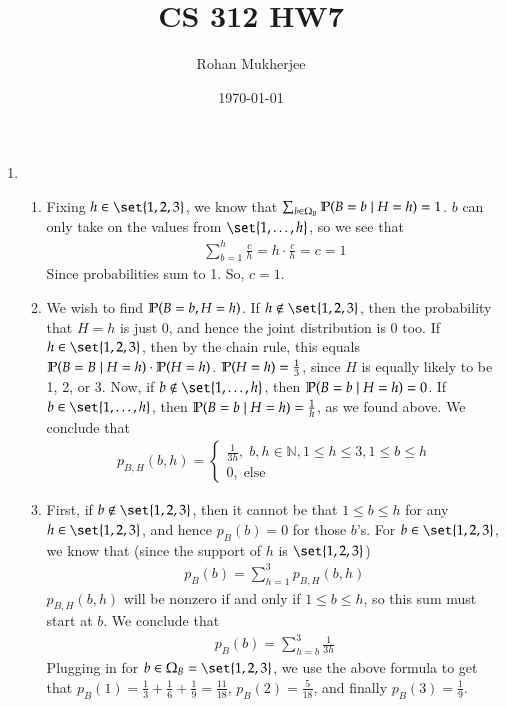 \documentclass[12pt]{article}
\title{CS 312 HW7}
\date{\today}
\author{Rohan Mukherjee}
\theoremstyle{definitionstyle}
\def\mbb#1{\mathbb{#1}}
\def\bN{\mbb{N}}
\renewcommand{\P}{\mathbb{P}\qty}
\begin{document}
	\maketitle
	\begin{enumerate}[leftmargin=\labelsep]
		\item \begin{enumerate}
			\item Fixing $h \in \set{1, 2, 3}$, we know that $\sum_{b \in \Omega_B} \P(B = b \mid H = h) = 1$. $b$ can only take on the values from $\set{1, \ldots, h}$, so we see that
			\begin{align*}
				\sum_{b=1}^h \frac ch = h \cdot \frac ch = c = 1
			\end{align*}
			Since probabilities sum to 1. So, $c = 1$.
			
			\item We wish to find $\P(B = b, H = h)$. If $h \not \in \set{1, 2, 3}$, then the probability that $H = h$ is just 0, and hence the joint distribution is 0 too. If $h \in \set{1, 2, 3}$, then by the chain rule, this equals $\P(B = B \mid H = h) \cdot \P(H = h)$. $\P(H = h) = \frac13$, since $H$ is equally likely to be 1, 2, or 3. Now, if $b \not \in \set{1,\ldots, h}$, then $\P(B = b \mid H = h) = 0$. If $b \in \set{1, \ldots, h}$, then $\P(B = b \mid H = h) = \frac1h$, as we found above. We conclude that
			\begin{align*}
				p_{B,H}(b, h) = \begin{cases}
					\frac{1}{3h}, \; b, h \in \bN, 1 \leq h \leq 3, 1 \leq b \leq h \\
					0, \; \text{else}
				\end{cases}
			\end{align*}
			
			\item First, if $b \not \in \set{1, 2, 3}$, then it cannot be that $1 \leq b \leq h$ for any $h \in \set{1, 2, 3}$, and hence $p_B(b) = 0$ for those $b$'s. For $b \in \set{1, 2, 3}$, we know that (since the support of $h$ is $\set{1, 2, 3}$)
			\begin{align*}
				p_B(b) = \sum_{h=1}^3 p_{B,H}(b, h)
			\end{align*}
			$p_{B, H}(b, h)$ will be nonzero if and only if $1 \leq b \leq h$, so this sum must start at $b$. We conclude that
			\begin{align*}
				p_B(b) = \sum_{h=b}^3 \frac{1}{3h}
			\end{align*}
			Plugging in for $b \in \Omega_B=\set{1, 2, 3}$, we use the above formula to get that $p_B(1) = \frac13 + \frac16 + \frac19 = \frac{11}{18}$, $p_B(2) = \frac{5}{18}$, and finally $p_B(3) = \frac19$.
			

\end{enumerate}
\end{enumerate}
\end{document}
